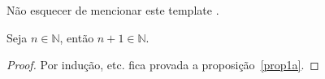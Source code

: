 \exercicio

Não esquecer de mencionar este template
\cite[Algo]{uabefoliotemplate}.

\alinea

\begin{prop}\label{prop1a}
	Seja $n \in \mathbb{N}$, então $n + 1 \in \mathbb{N}$.
\end{prop}

\begin{proof}
	Por indução, etc. fica provada a proposição~\ref{prop1a}.
\end{proof}
